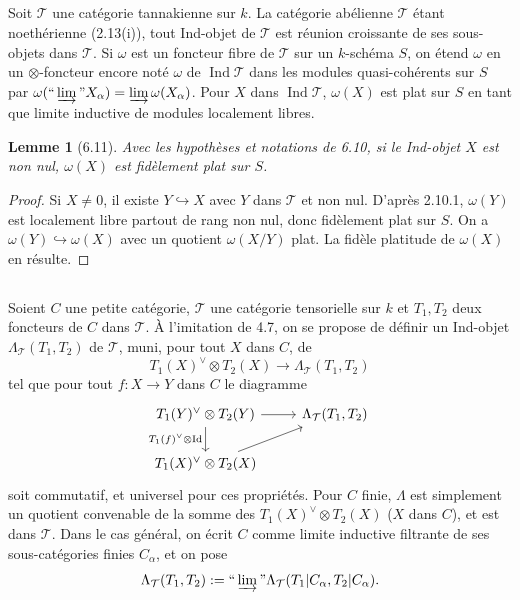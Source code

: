 \documentclass[12pt,a4paper]{article}
\theoremstyle{plain}
\newtheorem{lemma}[theorem]{Lemme}
\theoremstyle{definition}
\DeclareMathOperator{\Id}{Id}
\DeclareMathOperator{\Ind}{Ind}
\begin{document}
\subsection{}

Soit $\mathcal{T}$ une catégorie tannakienne sur $k$. La catégorie abélienne $\mathcal{T}$ étant noethérienne (2.13(i)), tout Ind-objet de $\mathcal{T}$ est réunion croissante de ses sous-objets dans $\mathcal{T}$. Si $\omega$ est un foncteur fibre de $\mathcal{T}$ sur un $k$-schéma $S$, on étend $\omega$ en un $\otimes$-foncteur encore noté $\omega$ de $\Ind\mathcal{T}$ dans les modules quasi-cohérents sur $S$ par $\omega(\text{``}\varinjlim\text{''} X_\alpha) = \varinjlim \omega(X_\alpha)$. Pour $X$ dans $\Ind\mathcal{T}$, $\omega(X)$ est plat sur $S$ en tant que limite inductive de modules localement libres.

\begin{lemma}[6.11]
Avec les hypothèses et notations de 6.10, si le Ind-objet $X$ est non nul, $\omega(X)$ est fidèlement plat sur $S$.
\end{lemma}

\begin{proof}
Si $X \neq 0$, il existe $Y \hookrightarrow X$ avec $Y$ dans $\mathcal{T}$ et non nul. D'après 2.10.1, $\omega(Y)$ est localement libre partout de rang non nul, donc fidèlement plat sur $S$. On a $\omega(Y) \hookrightarrow \omega(X)$ avec un quotient $\omega(X/Y)$ plat. La fidèle platitude de $\omega(X)$ en résulte.
\end{proof}

\subsection{}

Soient $C$ une petite catégorie, $\mathcal{T}$ une catégorie tensorielle sur $k$ et $T_1, T_2$ deux foncteurs de $C$ dans $\mathcal{T}$. À l'imitation de 4.7, on se propose de définir un Ind-objet $\Lambda_\mathcal{T}(T_1, T_2)$ de $\mathcal{T}$, muni, pour tout $X$ dans $C$, de
\begin{equation}\label{eq:6.12.1}
T_1(X)^\vee \otimes T_2(X) \to \Lambda_\mathcal{T}(T_1, T_2)
\end{equation}
tel que pour tout $f : X \to Y$ dans $C$ le diagramme
\begin{equation}\label{eq:6.12.2}
\begin{tikzcd}
T_1(Y)^\vee \otimes T_2(Y) \arrow[r] \arrow[d, "T_1(f)^\vee \otimes \Id"'] & \Lambda_\mathcal{T}(T_1, T_2) \\
T_1(X)^\vee \otimes T_2(X) \arrow[ur]
\end{tikzcd}
\end{equation}
soit commutatif, et universel pour ces propriétés. Pour $C$ finie, $\Lambda$ est simplement un quotient convenable de la somme des $T_1(X)^\vee \otimes T_2(X)$ ($X$ dans $C$), et est dans $\mathcal{T}$. Dans le cas général, on écrit $C$ comme limite inductive filtrante de ses sous-catégories finies $C_\alpha$, et on pose
\[
\Lambda_\mathcal{T}(T_1, T_2) := \text{``}\varinjlim\text{''} \Lambda_\mathcal{T}(T_1|C_\alpha, T_2|C_\alpha).
\]
\end{document}
